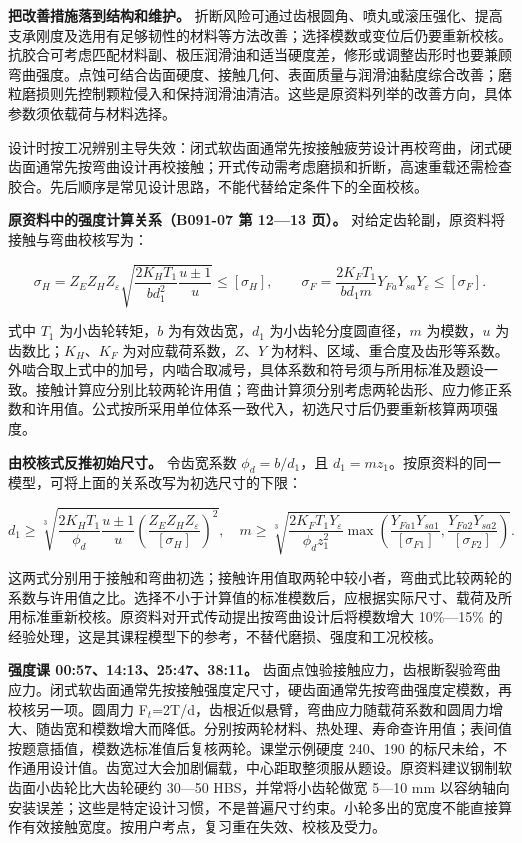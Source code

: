 \documentclass[zihao=5,a4paper,UTF8,fontset=fandol]{ctexart}
\begin{document}
\textbf{把改善措施落到结构和维护。} 折断风险可通过齿根圆角、喷丸或滚压强化、提高支承刚度及选用有足够韧性的材料等方法改善；选择模数或变位后仍要重新校核。抗胶合可考虑匹配材料副、极压润滑油和适当硬度差，修形或调整齿形时也要兼顾弯曲强度。点蚀可结合齿面硬度、接触几何、表面质量与润滑油黏度综合改善；磨粒磨损则先控制颗粒侵入和保持润滑油清洁。这些是原资料列举的改善方向，具体参数须依载荷与材料选择。


设计时按工况辨别主导失效：闭式软齿面通常先按接触疲劳设计再校弯曲，闭式硬齿面通常先按弯曲设计再校接触；开式传动需考虑磨损和折断，高速重载还需检查胶合。先后顺序是常见设计思路，不能代替给定条件下的全面校核。




\textbf{原资料中的强度计算关系（B091-07 第 12—13 页）。} 对给定齿轮副，原资料将接触与弯曲校核写为：


\[
\sigma_H=Z_E Z_H Z_\varepsilon\sqrt{\frac{2K_H T_1}{b d_1^2}\frac{u\pm1}{u}}\leq[\sigma_H],\qquad
\sigma_F=\frac{2K_FT_1}{b d_1 m}Y_{Fa}Y_{sa}Y_\varepsilon\leq[\sigma_F].
\]


式中 $T_1$ 为小齿轮转矩，$b$ 为有效齿宽，$d_1$ 为小齿轮分度圆直径，$m$ 为模数，$u$ 为齿数比；$K_H$、$K_F$ 为对应载荷系数，$Z$、$Y$ 为材料、区域、重合度及齿形等系数。外啮合取上式中的加号，内啮合取减号，具体系数和符号须与所用标准及题设一致。接触计算应分别比较两轮许用值；弯曲计算须分别考虑两轮齿形、应力修正系数和许用值。公式按所采用单位体系一致代入，初选尺寸后仍要重新核算两项强度。


\textbf{由校核式反推初始尺寸。} 令齿宽系数 $\phi_d=b/d_1$，且 $d_1=mz_1$。按原资料的同一模型，可将上面的关系改写为初选尺寸的下限：


\[
d_1\geq\sqrt[3]{\frac{2K_HT_1}{\phi_d}\frac{u\pm1}{u}\left(\frac{Z_EZ_HZ_\varepsilon}{[\sigma_H]}\right)^2},\quad
m\geq\sqrt[3]{\frac{2K_FT_1Y_\varepsilon}{\phi_d z_1^2}\max\left(\frac{Y_{Fa1}Y_{sa1}}{[\sigma_{F1}]},\frac{Y_{Fa2}Y_{sa2}}{[\sigma_{F2}]}\right)}.
\]


这两式分别用于接触和弯曲初选；接触许用值取两轮中较小者，弯曲式比较两轮的系数与许用值之比。选择不小于计算值的标准模数后，应根据实际尺寸、载荷及所用标准重新校核。原资料对开式传动提出按弯曲设计后将模数增大 10\%—15\% 的经验处理，这是其课程模型下的参考，不替代磨损、强度和工况校核。


\textbf{强度课 00:57、14:13、25:47、38:11。} 齿面点蚀验接触应力，齿根断裂验弯曲应力。闭式软齿面通常先按接触强度定尺寸，硬齿面通常先按弯曲强度定模数，再校核另一项。圆周力 F$_{t}$=2T/d，齿根近似悬臂，弯曲应力随载荷系数和圆周力增大、随齿宽和模数增大而降低。分别按两轮材料、热处理、寿命查许用值；表间值按题意插值，模数选标准值后复核两轮。课堂示例硬度 240、190 的标尺未给，不作通用设计值。齿宽过大会加剧偏载，中心距取整须服从题设。原资料建议钢制软齿面小齿轮比大齿轮硬约 30—50 HBS，并常将小齿轮做宽 5—10 mm 以容纳轴向安装误差；这些是特定设计习惯，不是普遍尺寸约束。小轮多出的宽度不能直接算作有效接触宽度。按用户考点，复习重在失效、校核及受力。
\end{document}

